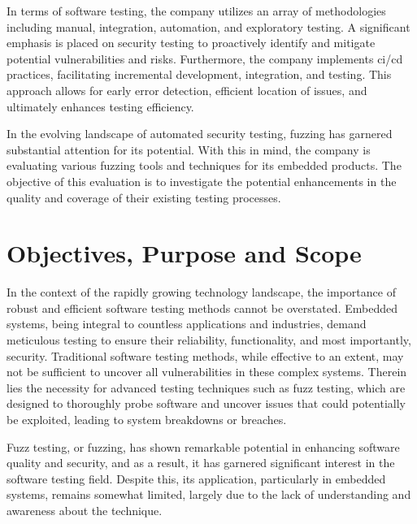 In terms of software testing, the company utilizes an array of methodologies
including manual, integration, automation, and exploratory testing\cite{WhatisEx64:online}.
A significant emphasis is placed on security testing\cite{baker2013analyzing} to proactively
identify and mitigate potential vulnerabilities and risks. Furthermore,
the company implements \gls{ci/cd} practices,
facilitating incremental development, integration, and testing. This approach
allows for early error detection, efficient location of issues, and
ultimately enhances testing efficiency\cite{DevOpsin19:online}.

In the evolving landscape of automated security testing, fuzzing has
garnered substantial attention for its potential. With this in mind,
the company is evaluating various fuzzing tools and techniques for its
embedded products. The objective of this evaluation is to investigate the
potential enhancements in the quality and coverage of their existing
testing processes.

\section{Objectives, Purpose and Scope}

In the context of the rapidly growing technology landscape, the importance of
robust and efficient software testing methods cannot be overstated.
Embedded systems, being integral to countless applications and industries,
demand meticulous testing to ensure their reliability, functionality, and most
importantly, security. Traditional software testing methods, while effective to
an extent, may not be sufficient to uncover all vulnerabilities in these
complex systems. Therein lies the necessity for advanced testing techniques
such as fuzz testing, which are designed to thoroughly probe software and uncover
issues that could potentially be exploited, leading to system breakdowns or breaches.

Fuzz testing, or fuzzing, has shown remarkable potential in enhancing software
quality and security, and as a result, it has garnered significant interest
in the software testing field. Despite this, its application, particularly in
embedded systems, remains somewhat limited, largely due to the lack of
understanding and awareness about the technique.
